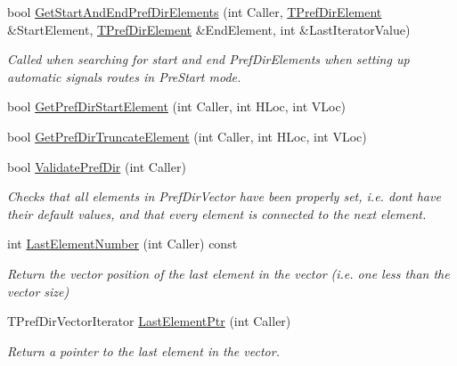 \begin{DoxyCompactItemize}
bool \mbox{\hyperlink{class_t_one_pref_dir_a0acdc81183b894d1d6aecb5f563efefc}{Get\+Start\+And\+End\+Pref\+Dir\+Elements}} (int Caller, \mbox{\hyperlink{class_t_pref_dir_element}{T\+Pref\+Dir\+Element}} \&Start\+Element, \mbox{\hyperlink{class_t_pref_dir_element}{T\+Pref\+Dir\+Element}} \&End\+Element, int \&Last\+Iterator\+Value)
\begin{DoxyCompactList}\small\item\em Called when searching for start and end Pref\+Dir\+Elements when setting up automatic signals routes in Pre\+Start mode. \end{DoxyCompactList}\item 
bool \mbox{\hyperlink{class_t_one_pref_dir_ace0402792492c9da2551423f8287e41e}{Get\+Pref\+Dir\+Start\+Element}} (int Caller, int H\+Loc, int V\+Loc)
\item 
bool \mbox{\hyperlink{class_t_one_pref_dir_a8fd55282096fe63f0baeab323c6ccc8b}{Get\+Pref\+Dir\+Truncate\+Element}} (int Caller, int H\+Loc, int V\+Loc)
\item 
\mbox{\label{class_t_one_pref_dir_a2b883633382e26cdff4583a24575d337}} 
bool \mbox{\hyperlink{class_t_one_pref_dir_a2b883633382e26cdff4583a24575d337}{Validate\+Pref\+Dir}} (int Caller)
\begin{DoxyCompactList}\small\item\em Checks that all elements in Pref\+Dir\+Vector have been properly set, i.\+e. don\textquotesingle{}t have their default values, and that every element is connected to the next element. \end{DoxyCompactList}\item 
\mbox{\label{class_t_one_pref_dir_a26a1ee9d1ced0d53e35936097d4896f0}} 
int \mbox{\hyperlink{class_t_one_pref_dir_a26a1ee9d1ced0d53e35936097d4896f0}{Last\+Element\+Number}} (int Caller) const
\begin{DoxyCompactList}\small\item\em Return the vector position of the last element in the vector (i.\+e. one less than the vector size) \end{DoxyCompactList}\item 
\mbox{\label{class_t_one_pref_dir_a42862b2abcd0eb356982f4ce46922922}} 
T\+Pref\+Dir\+Vector\+Iterator \mbox{\hyperlink{class_t_one_pref_dir_a42862b2abcd0eb356982f4ce46922922}{Last\+Element\+Ptr}} (int Caller)
\begin{DoxyCompactList}\small\item\em Return a pointer to the last element in the vector. \end{DoxyCompactList}\item 

\end{DoxyCompactItemize}

